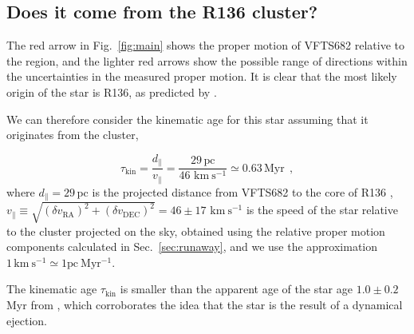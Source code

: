 \documentclass{aa}
\newcommand{\kms}{{\,\mathrm{km\ s^{-1}}}}
\DeclareRobustCommand{\Figref}[1]{Fig.~\ref{#1}}
\DeclareRobustCommand{\Secref}[1]{Sec.~\ref{#1}}
\begin{document}
{\subsection{Does it come from the R136 cluster?}
\label{sec:r136_origin}

The red arrow in \Figref{fig:main} shows the proper motion of VFTS682
relative to the region, and the lighter red arrows show the possible
range of directions within the uncertainties in the measured proper
motion. It is clear that the most likely origin of the star is R136,
as predicted by \cite{fujii:11, banerjee:12}.


We can therefore consider the kinematic age for this star assuming
that it originates from the cluster,

\begin{equation}
  \label{eq:kin_age}
  \tau_\mathrm{kin} = \frac{d_\parallel}{v_\parallel} =
  \frac{29\,\mathrm{pc}}{46\,\kms} \simeq 0.63\, \mathrm{Myr} \ \ ,
\end{equation}
where $d_\parallel =29$\,pc is the projected distance from VFTS682 to
the core of R136 \citep[][]{bestenlehner:11}, $v_\parallel \equiv \sqrt{\left(\delta v_\mathrm{RA}\right)^2
    +\left(\delta v_\mathrm{DEC}\right)^2} =46\pm
17\,\kms$ is the speed of the star relative to the cluster projected on the sky, obtained
using the relative proper motion components calculated in
\Secref{sec:runaway}, and we use the approximation $1 \kms \simeq 1
\mathrm{pc \ Myr^{-1}}$.

The kinematic age $\tau_\mathrm{kin}$ is smaller than the apparent age
of the star age $1.0\pm 0.2$\,Myr from \cite{schneider:18}, which
corroborates the idea that the star is the result of a dynamical
ejection. 

}
\end{document}
